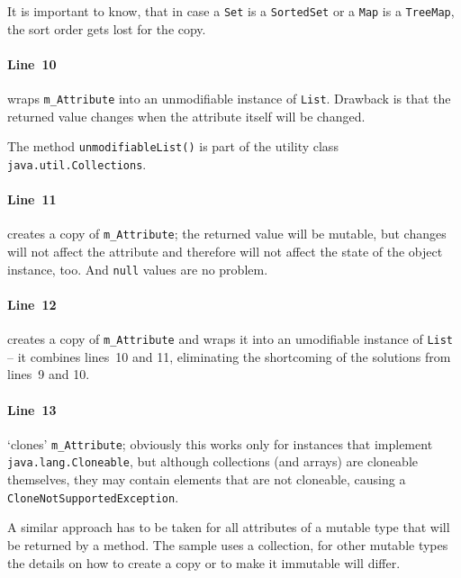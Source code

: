 \documentclass[11pt,a4paper, titlepage, parskip=half, headsepline, footsepline, cleardoublepage=current, headheight=1cm]{scrbook}
\begin{document}
It is important to know, that in case a \lstinline|Set| is a \lstinline|SortedSet|\autocite{ORACLE_DOC_SORTEDSET_CLASS} or a \lstinline|Map| is a \lstinline|TreeMap|\autocite{ORACLE_DOC_TREEMAP_CLASS}, the sort order gets lost for the copy.

\paragraph{Line~10} wraps \lstinline|m_Attribute| into an unmodifiable instance of \lstinline|List|. Drawback is that the returned value changes when the attribute itself will be changed.

The method \lstinline|unmodifiableList()| is part of the utility class \lstinline|java.util.Collections|\autocite{ORACLE_DOC_COLLECTIONS_CLASS}.

\paragraph{Line~11} creates a copy of \lstinline|m_Attribute|; the returned value will be mutable, but changes will not affect the attribute and therefore will not affect the state of the object instance, too. And \lstinline|null| values are no problem.

\paragraph{Line~12} creates a copy of \lstinline|m_Attribute| and wraps it into an umodifiable instance of \lstinline|List| – it combines lines~10 and 11, eliminating the shortcoming of the solutions from lines~9 and 10.

\paragraph{Line~13} ‘clones’ \lstinline|m_Attribute|; obviously this works only for instances that implement \lstinline|java.lang.Cloneable|\autocite{ORACLE_DOC_CLONEABLE_INTERFACE}, but although collections (and arrays) are cloneable themselves, they may contain elements that are not cloneable, causing a \lstinline|CloneNotSupportedException|\autocite{ORACLE_DOC_CLONENOTSUPPORTEDEXCEPTION_CLASS}.

A similar approach has to be taken for all attributes of a mutable type that will be returned by a method. The sample uses a collection, for other mutable types the details on how to create a copy or to make it immutable will differ.
\end{document}

